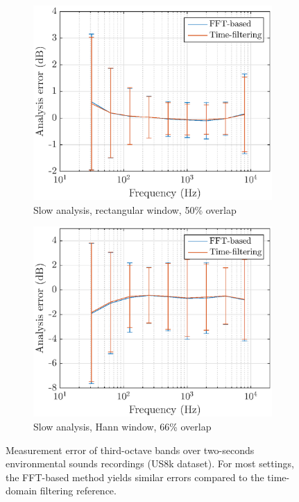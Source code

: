 \documentclass[sensors,article,accept,moreauthors,pdftex,10pt,a4paper]{mdpi}
\begin{document}
\begin{figure}[H]
	\begin{subfigure}[H]{0.47\textwidth}
        \centering
        \includegraphics[width=1\textwidth]{figures/err_m_u_s_r.eps}
        \caption{Slow analysis, rectangular window, 50\% overlap}
    \end{subfigure}
    \begin{subfigure}[H]{0.475\textwidth}
        \centering
        \includegraphics[width=1\textwidth]{figures/err_m_u_s_h.eps}
        \caption{Slow analysis, Hann window, 66\% overlap}
    \end{subfigure}
    \vspace{-10pt}
    \caption{Measurement error of third-octave bands over two-seconds environmental sounds recordings (US8k dataset). For most {settings,} the FFT-based method yields similar errors compared to the time-domain filtering reference. \label{fig:errormu}}
\end{figure}
\end{document}
